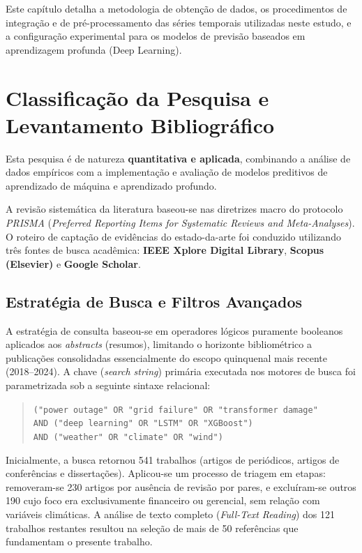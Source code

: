 Este capítulo detalha a metodologia de obtenção de dados, os procedimentos de integração e de pré-processamento das séries temporais utilizadas neste estudo, e a configuração experimental para os modelos de previsão baseados em aprendizagem profunda (Deep Learning).

\section{Classificação da Pesquisa e Levantamento Bibliográfico}\label{sec:classificacao_pesquisa}
Esta pesquisa é de natureza \textbf{quantitativa e aplicada}, combinando a análise de dados empíricos com a implementação e avaliação de modelos preditivos de aprendizado de máquina e aprendizado profundo.

A revisão sistemática da literatura baseou-se nas diretrizes macro do protocolo \textit{PRISMA} (\textit{Preferred Reporting Items for Systematic Reviews and Meta-Analyses}). O roteiro de captação de evidências do estado-da-arte foi conduzido utilizando três fontes de busca acadêmica: \textbf{IEEE Xplore Digital Library}, \textbf{Scopus (Elsevier)} e \textbf{Google Scholar}.

\subsection{Estratégia de Busca e Filtros Avançados}
A estratégia de consulta baseou-se em operadores lógicos puramente booleanos aplicados aos \textit{abstracts} (resumos), limitando o horizonte bibliométrico a publicações consolidadas essencialmente do escopo quinquenal mais recente (2018--2024). A chave (\textit{search string}) primária executada nos motores de busca foi parametrizada sob a seguinte sintaxe relacional:

\begin{quote}
\small\texttt{("power outage" OR "grid failure" OR "transformer damage"}\\\texttt{AND ("deep learning" OR "LSTM" OR "XGBoost")}\\\texttt{AND ("weather" OR "climate" OR "wind")}
\end{quote}

Inicialmente, a busca retornou 541 trabalhos (artigos de periódicos, artigos de conferências e dissertações). Aplicou-se um processo de triagem em etapas: removeram-se 230 artigos por ausência de revisão por pares, e excluíram-se outros 190 cujo foco era exclusivamente financeiro ou gerencial, sem relação com variáveis climáticas. A análise de texto completo (\textit{Full-Text Reading}) dos 121 trabalhos restantes resultou na seleção de mais de 50 referências que fundamentam o presente trabalho.

